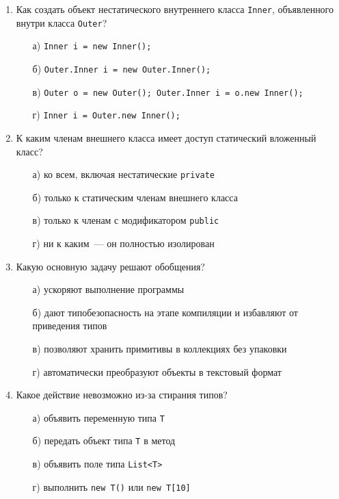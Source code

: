 \begin{enumerate}

\item Как создать объект нестатического внутреннего класса \texttt{Inner},
      объявленного внутри класса \texttt{Outer}?
  \begin{enumerate}
    \item[а)] \texttt{Inner i = new Inner();}
    \item[б)] \texttt{Outer.Inner i = new Outer.Inner();}
    \item[в)] \texttt{Outer o = new Outer(); Outer.Inner i = o.new Inner();}
    \item[г)] \texttt{Inner i = Outer.new Inner();}
  \end{enumerate}

\item К каким членам внешнего класса имеет доступ статический вложенный класс?
  \begin{enumerate}
    \item[а)] ко всем, включая нестатические \texttt{private}
    \item[б)] только к статическим членам внешнего класса
    \item[в)] только к членам с модификатором \texttt{public}
    \item[г)] ни к каким~--- он полностью изолирован
  \end{enumerate}

\item Какую основную задачу решают обобщения?
  \begin{enumerate}
    \item[а)] ускоряют выполнение программы
    \item[б)] дают типобезопасность на этапе компиляции и избавляют от
              приведения типов
    \item[в)] позволяют хранить примитивы в коллекциях без упаковки
    \item[г)] автоматически преобразуют объекты в текстовый формат
  \end{enumerate}

\item Какое действие невозможно из-за стирания типов?
  \begin{enumerate}
    \item[а)] объявить переменную типа \texttt{T}
    \item[б)] передать объект типа \texttt{T} в метод
    \item[в)] объявить поле типа \texttt{List<T>}
    \item[г)] выполнить \texttt{new T()} или \texttt{new T[10]}
  \end{enumerate}


\end{enumerate}
